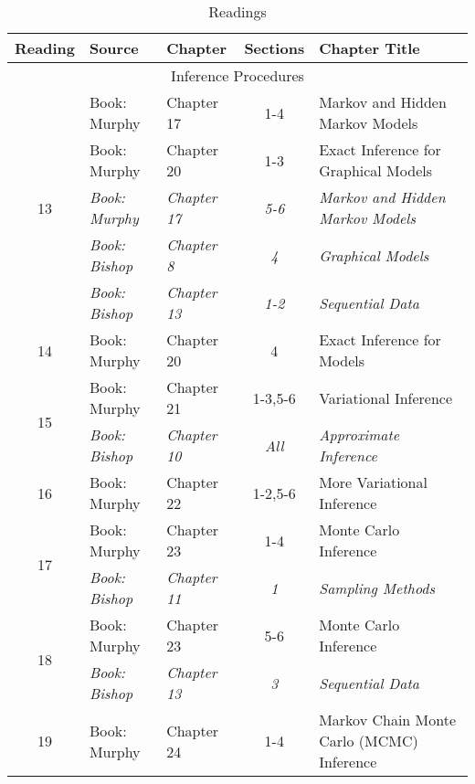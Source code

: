 \documentclass[12pt]{article}
\begin{document}
{    \begin{table}
    \caption{Readings}
    \label{table:readings2}
    \begin{center}
        \begin{tabular}{| c | l | l | c | p{6 cm} |}
            \hline
            Reading & Source & Chapter & Sections & Chapter Title \\
            \hline
            \multicolumn{5}{|c|}{Inference Procedures} \\
            \hline
            \multirow{5}{*}{13} & Book: Murphy & Chapter 17 & 1-4 & Markov and Hidden Markov Models \\
                               & Book: Murphy & Chapter 20 & 1-3 & Exact Inference for Graphical Models \\
                               & \textit{Book: Murphy} & \textit{Chapter 17} & \textit{5-6} & \textit{Markov and Hidden Markov Models} \\
                               & \textit{Book: Bishop} & \textit{Chapter 8} & \textit{4} & \textit{Graphical Models} \\
                               & \textit{Book: Bishop} & \textit{Chapter 13} & \textit{1-2} & \textit{Sequential Data} \\
            \hline
            \multirow{1}{*}{14} & Book: Murphy & Chapter 20 & 4 & Exact Inference for Models \\
            \hline
            \multirow{2}{*}{15} & Book: Murphy & Chapter 21 & 1-3,5-6 & Variational Inference \\
                               & \textit{Book: Bishop} & \textit{Chapter 10} & \textit{All} & \textit{Approximate Inference} \\
            \hline
            \multirow{1}{*}{16} & Book: Murphy & Chapter 22 & 1-2,5-6 & More Variational Inference \\
            \hline
            \multirow{2}{*}{17} & Book: Murphy & Chapter 23 & 1-4 & Monte Carlo Inference \\
                               & \textit{Book: Bishop} & \textit{Chapter 11} & \textit{1} & \textit{Sampling Methods} \\
            \hline
            \multirow{2}{*}{18} & Book: Murphy & Chapter 23 & 5-6 & Monte Carlo Inference \\
                               & \textit{Book: Bishop} & \textit{Chapter 13} & \textit{3} & \textit{Sequential Data} \\
            \hline
            \multirow{2}{*}{19} & Book: Murphy & Chapter 24 & 1-4 & Markov Chain Monte Carlo (MCMC) Inference \\

\end{tabular}
\end{center}
\end{table}}
\end{document}
